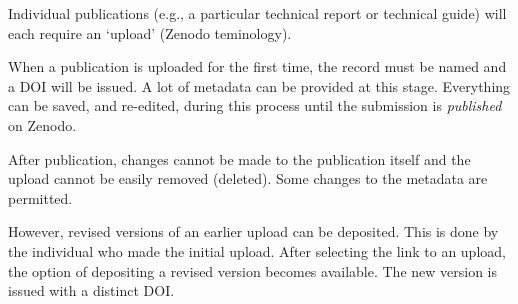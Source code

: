 {Individual publications (e.g., a particular technical report or technical guide) will each require an `upload' (Zenodo teminology). 

When a publication is uploaded for the first time, the record must be named and a DOI will be issued. A lot of metadata can be provided at this stage. Everything can be saved, and re-edited,  during this process until the submission is \textit{published} on Zenodo. 

After publication, changes cannot be made to the publication itself and the upload cannot be easily removed (deleted). Some changes to the metadata are permitted. 

However, revised versions of an earlier upload can be deposited. This is done by the individual who made the initial upload. After selecting the link to an upload, the option of depositing a revised version becomes available. The new version is issued with a distinct DOI.    

%
%	
%	
%	
%	
%	  
%
%

}
